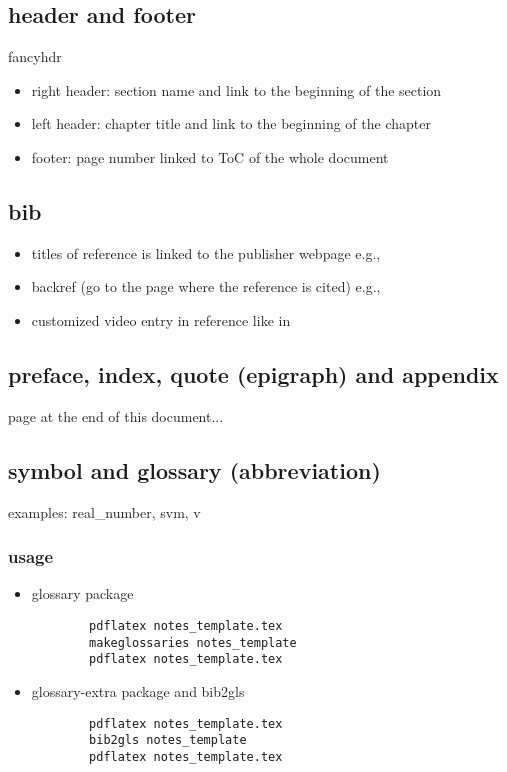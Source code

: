 \subsection{header and footer}
fancyhdr
\begin{itemize}
	\item right header: section name and link to the beginning of the section
	\item left header: chapter title and link to the beginning of the chapter
	\item footer: page number linked to ToC of the whole document
\end{itemize}

\subsection{bib}
\begin{itemize}
	\item titles of reference is linked to the publisher webpage e.g., \cite{kitaev2002classical}
	\item backref (go to the page where the reference is cited) e.g., \cite{childsUniversalComputationQuantum2009}
	\item customized video entry in reference like in \cite{babaiGraphIsomorphismQuasipolynomial2016}
\end{itemize}

\subsection{preface, index, quote (epigraph) and appendix}
 page at the end of this document...

\subsection{symbol and glossary (abbreviation)}
examples: 
\gls{real_number},
\gls{svm},
\gls{v}

\subsubsection{usage}
\begin{itemize}
	\item glossary package 
	\begin{verbatim}
		pdflatex notes_template.tex
		makeglossaries notes_template
		pdflatex notes_template.tex	
	\end{verbatim}

	\item glossary-extra package and bib2gls
	\begin{verbatim}
		pdflatex notes_template.tex
		bib2gls notes_template
		pdflatex notes_template.tex	
	\end{verbatim}
\end{itemize}


